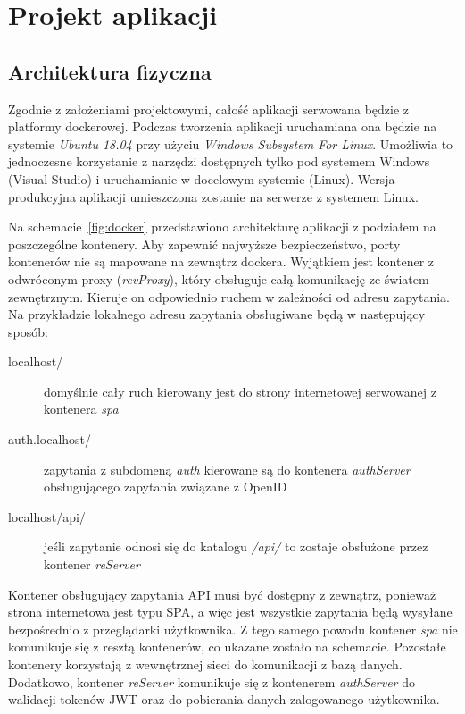 \chapter{Projekt aplikacji}
\label{sec:projekt}

\section{Architektura fizyczna}
	Zgodnie z założeniami projektowymi, całość aplikacji serwowana będzie z platformy dockerowej.
	Podczas tworzenia aplikacji uruchamiana ona będzie na systemie \emph{Ubuntu 18.04} przy użyciu \emph{Windows Subsystem For Linux}.
	Umożliwia to jednoczesne korzystanie z narzędzi dostępnych tylko pod systemem Windows (Visual Studio) i uruchamianie w docelowym systemie (Linux).
	Wersja produkcyjna aplikacji umieszczona zostanie na serwerze z systemem Linux.

	Na schemacie~\ref{fig:docker} przedstawiono architekturę aplikacji z podziałem na poszczególne kontenery.
	Aby zapewnić najwyższe bezpieczeństwo, porty kontenerów nie są mapowane na zewnątrz dockera.
	Wyjątkiem jest kontener z odwróconym proxy (\emph{revProxy}), który obsługuje całą komunikację ze światem zewnętrznym.
	Kieruje on odpowiednio ruchem w zależności od adresu zapytania.
	Na przykładzie lokalnego adresu zapytania obsługiwane będą w następujący sposób:
	\begin{description}
		\item[localhost/] domyślnie cały ruch kierowany jest do strony internetowej serwowanej z kontenera \emph{spa}
		\item[auth.localhost/] zapytania z subdomeną \emph{auth} kierowane są do kontenera \emph{authServer} obsługującego zapytania związane z OpenID
		\item[localhost/api/] jeśli zapytanie odnosi się do katalogu \emph{/api/} to zostaje obsłużone przez kontener \emph{reServer}
	\end{description}

	Kontener obsługujący zapytania API musi być dostępny z zewnątrz, ponieważ strona internetowa jest typu SPA,
	a więc jest wszystkie zapytania będą wysyłane bezpośrednio z przeglądarki użytkownika.
	Z tego samego powodu kontener \emph{spa} nie komunikuje się z resztą kontenerów, co ukazane zostało na schemacie.
	Pozostałe kontenery korzystają z wewnętrznej sieci do komunikacji z bazą danych.
	Dodatkowo, kontener \emph{reServer} komunikuje się z kontenerem \emph{authServer} do walidacji tokenów JWT oraz do pobierania danych zalogowanego użytkownika.

